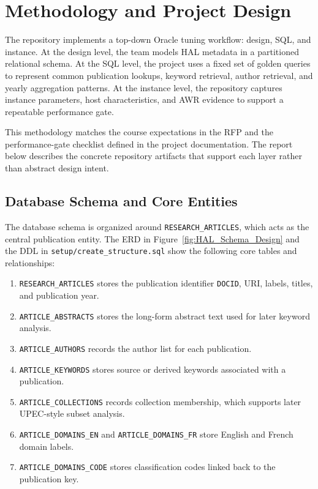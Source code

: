 \documentclass[conference]{IEEEtran}
\begin{document}
\section{Methodology and Project Design}

The repository implements a top-down Oracle tuning workflow: design, SQL, and instance. At the design level, the team models HAL metadata in a partitioned relational schema. At the SQL level, the project uses a fixed set of golden queries to represent common publication lookups, keyword retrieval, author retrieval, and yearly aggregation patterns. At the instance level, the repository captures instance parameters, host characteristics, and AWR evidence to support a repeatable performance gate.

This methodology matches the course expectations in the RFP and the performance-gate checklist defined in the project documentation. The report below describes the concrete repository artifacts that support each layer rather than abstract design intent.

\subsection{Database Schema and Core Entities}

The database schema is organized around \verb|RESEARCH_ARTICLES|, which acts as the central publication entity. The ERD in Figure~\ref{fig:HAL_Schema_Design} and the DDL in \verb|setup/create_structure.sql| show the following core tables and relationships:
\begin{enumerate}
    \item \verb|RESEARCH_ARTICLES| stores the publication identifier \verb|DOCID|, URI, labels, titles, and publication year.
    \item \verb|ARTICLE_ABSTRACTS| stores the long-form abstract text used for later keyword analysis.
    \item \verb|ARTICLE_AUTHORS| records the author list for each publication.
    \item \verb|ARTICLE_KEYWORDS| stores source or derived keywords associated with a publication.
    \item \verb|ARTICLE_COLLECTIONS| records collection membership, which supports later UPEC-style subset analysis.
    \item \verb|ARTICLE_DOMAINS_EN| and \verb|ARTICLE_DOMAINS_FR| store English and French domain labels.
    \item \verb|ARTICLE_DOMAINS_CODE| stores classification codes linked back to the publication key.
\end{enumerate}
\end{document}
